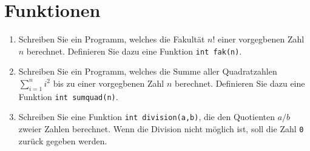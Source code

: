 \documentclass[paper=a4, fontsize=11pt, twoside]{scrartcl}
\begin{document}
\section*{Funktionen}
\begin{enumerate}[resume]
\item Schreiben Sie ein Programm, welches die Fakultät $n!$ einer vorgegbenen Zahl $n$ berechnet. Definieren Sie dazu eine Funktion \texttt{int fak(n)}.
  \item Schreiben Sie ein Programm, welches die Summe aller Quadratzahlen $\sum\limits_{i=1}^{n}i^2$ bis zu einer vorgegbenen Zahl $n$ berechnet. Definieren Sie dazu eine Funktion \texttt{int sumquad(n)}.
  \item Schreiben Sie eine Funktion \texttt{int division(a,b)}, die den Quotienten $a/b$ zweier Zahlen berechnet. Wenn die Division nicht möglich ist, soll die Zahl \texttt{0} zurück gegeben werden.
\end{enumerate}
\end{document}
